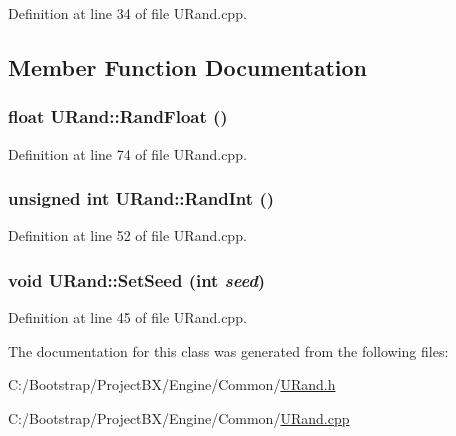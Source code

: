 Definition at line 34 of file URand.cpp.

\subsection{Member Function Documentation}
\hypertarget{class_u_rand_7ee6d018f0615328bb30d446250f0455}{
\subsubsection[{RandFloat}]{\setlength{\rightskip}{0pt plus 5cm}float URand::RandFloat ()}}
\label{class_u_rand_7ee6d018f0615328bb30d446250f0455}




Definition at line 74 of file URand.cpp.\hypertarget{class_u_rand_aa7214050f5f14049e8db4b3fe333dd9}{
\subsubsection[{RandInt}]{\setlength{\rightskip}{0pt plus 5cm}unsigned int URand::RandInt ()}}
\label{class_u_rand_aa7214050f5f14049e8db4b3fe333dd9}




Definition at line 52 of file URand.cpp.\hypertarget{class_u_rand_547e45e8643d8d2ed250ef1ccc5b0d5b}{
\subsubsection[{SetSeed}]{\setlength{\rightskip}{0pt plus 5cm}void URand::SetSeed (int {\em seed})}}
\label{class_u_rand_547e45e8643d8d2ed250ef1ccc5b0d5b}




Definition at line 45 of file URand.cpp.

The documentation for this class was generated from the following files:\begin{CompactItemize}
\item 
C:/Bootstrap/ProjectBX/Engine/Common/\hyperlink{_u_rand_8h}{URand.h}\item 
C:/Bootstrap/ProjectBX/Engine/Common/\hyperlink{_u_rand_8cpp}{URand.cpp}\end{CompactItemize}
